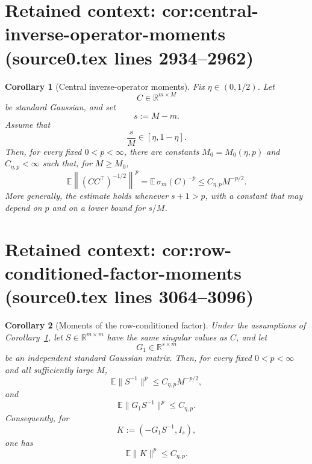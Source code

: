 \documentclass[10pt,a4paper]{amsart}
\newcommand{\Ebb}{\mathbb E}
\newcommand{\R}{\mathbb R}
\theoremstyle{plain}
\newtheorem{corollary}{Corollary}
\begin{document}
\section*{Retained context: cor:central-inverse-operator-moments (source0.tex lines 2934--2962)}

\begin{corollary}[Central inverse-operator moments]
\label{cor:central-inverse-operator-moments}
Fix \(\eta\in(0,1/2)\).  Let
\[
        C\in\R^{m\times M}
\]
be standard Gaussian, and set
\[
        s:=M-m.
\]
Assume that
\[
        \frac{s}{M}\in[\eta,1-\eta].
\]
Then, for every fixed \(0<p<\infty\), there are constants
\(M_0=M_0(\eta,p)\) and \(C_{\eta,p}<\infty\) such that, for
\(M\ge M_0\),
\begin{equation}
        \Ebb
        \left\|(CC^\top)^{-1/2}\right\|^p
        =
        \Ebb\,\sigma_m(C)^{-p}
        \le
        C_{\eta,p}M^{-p/2}.
        \label{eq:central-inverse-operator-moments}
\end{equation}
More generally, the estimate holds whenever \(s+1>p\), with a constant that may
depend on \(p\) and on a lower bound for \(s/M\).
\end{corollary}


\section*{Retained context: cor:row-conditioned-factor-moments (source0.tex lines 3064--3096)}

\begin{corollary}[Moments of the row-conditioned factor]
\label{cor:row-conditioned-factor-moments}
Under the assumptions of
Corollary~\ref{cor:central-inverse-operator-moments}, let
\(S\in\R^{m\times m}\) have the same singular values as \(C\), and let
\[
        G_1\in\R^{s\times m}
\]
be an independent standard Gaussian matrix.  Then, for every fixed
\(0<p<\infty\) and all sufficiently large \(M\),
\begin{equation}
        \Ebb\|S^{-1}\|^p
        \le
        C_{\eta,p}M^{-p/2},
        \label{eq:central-S-inverse-moments}
\end{equation}
and
\begin{equation}
        \Ebb\|G_1S^{-1}\|^p
        \le
        C_{\eta,p}.
        \label{eq:central-conditioned-factor-moments}
\end{equation}
Consequently, for
\[
        K:=(-G_1S^{-1},I_s),
\]
one has
\begin{equation}
        \Ebb\|K\|^p\le C_{\eta,p}.
        \label{eq:central-K-moments}
\end{equation}
\end{corollary}
\end{document}
